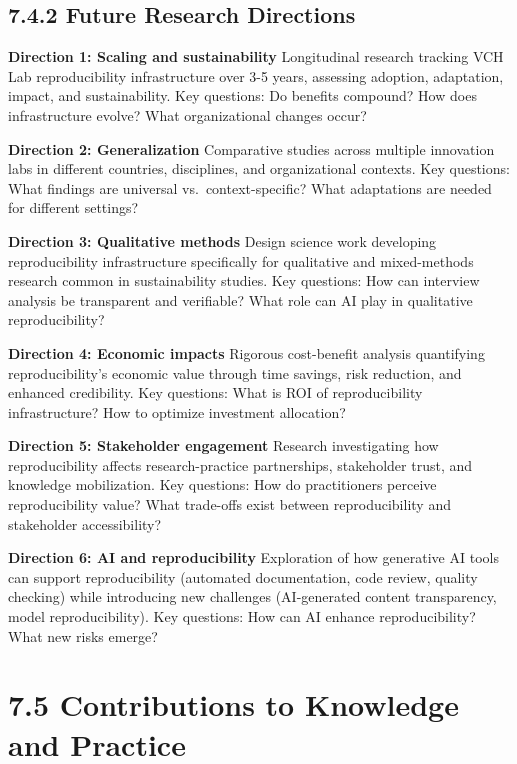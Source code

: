 \documentclass[
  oneside,
  open=any]{scrbook}
\begin{document}
\subsection{7.4.2 Future Research
Directions}\label{future-research-directions}

\textbf{Direction 1: Scaling and sustainability} Longitudinal research
tracking VCH Lab reproducibility infrastructure over 3-5 years,
assessing adoption, adaptation, impact, and sustainability. Key
questions: Do benefits compound? How does infrastructure evolve? What
organizational changes occur?

\textbf{Direction 2: Generalization} Comparative studies across multiple
innovation labs in different countries, disciplines, and organizational
contexts. Key questions: What findings are universal
vs.~context-specific? What adaptations are needed for different
settings?

\textbf{Direction 3: Qualitative methods} Design science work developing
reproducibility infrastructure specifically for qualitative and
mixed-methods research common in sustainability studies. Key questions:
How can interview analysis be transparent and verifiable? What role can
AI play in qualitative reproducibility?

\textbf{Direction 4: Economic impacts} Rigorous cost-benefit analysis
quantifying reproducibility's economic value through time savings, risk
reduction, and enhanced credibility. Key questions: What is ROI of
reproducibility infrastructure? How to optimize investment allocation?

\textbf{Direction 5: Stakeholder engagement} Research investigating how
reproducibility affects research-practice partnerships, stakeholder
trust, and knowledge mobilization. Key questions: How do practitioners
perceive reproducibility value? What trade-offs exist between
reproducibility and stakeholder accessibility?

\textbf{Direction 6: AI and reproducibility} Exploration of how
generative AI tools can support reproducibility (automated
documentation, code review, quality checking) while introducing new
challenges (AI-generated content transparency, model reproducibility).
Key questions: How can AI enhance reproducibility? What new risks
emerge?

\section{7.5 Contributions to Knowledge and
Practice}\label{contributions-to-knowledge-and-practice}
\end{document}
